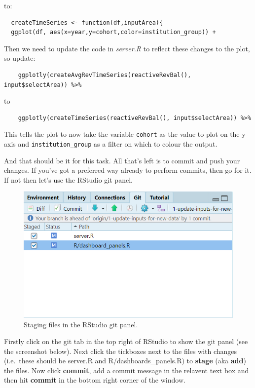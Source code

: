 \documentclass[
  12pt,
]{article}
\begin{document}
to:

\begin{verbatim}
  createTimeSeries <- function(df,inputArea){
  ggplot(df, aes(x=year,y=cohort,color=institution_group)) + 
\end{verbatim}

Then we need to update the code in \emph{server.R} to reflect these
changes to the plot, so update:

\begin{verbatim}
    ggplotly(createAvgRevTimeSeries(reactiveRevBal(), input$selectArea)) %>%
\end{verbatim}

to

\begin{verbatim}
    ggplotly(createTimeSeries(reactiveRevBal(), input$selectArea)) %>%
\end{verbatim}

This tells the plot to now take the variable \texttt{cohort} as the
value to plot on the y-axis and \texttt{institution\_group} as a filter
on which to colour the output.

And that should be it for this task. All that's left is to commit and
push your changes. If you've got a preferred way already to perform
commits, then go for it. If not then let's use the RStudio git panel.

\begin{figure}

{\centering \includegraphics[width=0.64\linewidth]{images/gitdemo/gitdemo-RStudio-gitpanel} 

}

\caption{Staging files in the RStudio git panel.}\label{fig:unnamed-chunk-14}
\end{figure}

Firstly click on the git tab in the top right of RStudio to show the git
panel (see the screenshot below). Next click the tickboxes next to the
files with changes (i.e.~these should be server.R and
R/dashboards\_panels.R) to \textbf{stage} (aka \textbf{add}) the files.
Now click \textbf{commit}, add a commit message in the relavent text box
and then hit \textbf{commit} in the bottom right corner of the window.
\end{document}
